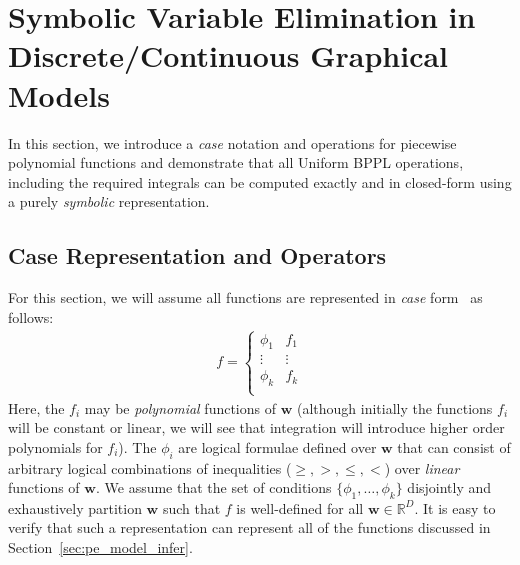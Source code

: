 \documentclass[letterpaper]{article}
\newcommand{\R}{\mathbb{R}}
\renewcommand{\vec}[1]{\mathbf{#1}}
\begin{document}
\section{Symbolic Variable Elimination in Discrete/Continuous Graphical Models}

In this section, we introduce a \emph{case} notation and operations
for piecewise polynomial functions and demonstrate that all Uniform
BPPL operations, including the required integrals can be computed
exactly and in closed-form using a purely \emph{symbolic}
representation.

\subsection{Case Representation and Operators}

For this section, we will assume all functions
are represented in \emph{case} form~\cite{uai11} as follows:
{%
\begin{align}
f = 
\begin{cases}
  \phi_1 & f_1 \\ 
  \vdots & \vdots \\ 
  \phi_k & f_k \\ 
\end{cases} 
\label{eq:case}
\end{align}
} Here, the $f_i$ may be \emph{polynomial} functions of $\vec{w}$ (although
initially the functions $f_i$ will be constant or linear, we will see
that integration will introduce higher order polynomials for $f_i$).  The
$\phi_i$ are logical formulae defined over $\vec{w}$ that can consist
of arbitrary logical combinations of inequalities ($\geq,>,\leq,<$)
over \emph{linear} functions of $\vec{w}$.  We assume that the set of
conditions $\{ \phi_1,\ldots,\phi_k \}$ disjointly and exhaustively
partition $\vec{w}$ such that $f$ is well-defined for all $\vec{w} \in
\R^D$.  It is easy to verify that such a representation can represent
all of the functions discussed in Section~\ref{sec:pe_model_infer}.
\end{document}

